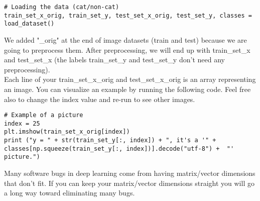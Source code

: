 \begin{verbatim}
# Loading the data (cat/non-cat)
train_set_x_orig, train_set_y, test_set_x_orig, test_set_y, classes = load_dataset()
\end{verbatim}

We added "\_orig" at the end of image datasets (train and test) because we are going to preprocess them. After preprocessing, we will end up with train\_set\_x and test\_set\_x (the labels train\_set\_y and test\_set\_y don't need any preprocessing).\\
Each line of your train\_set\_x\_orig and test\_set\_x\_orig is an array representing an image. You can visualize an example by running the following code. Feel free also to change the index value and re-run to see other images.

\begin{verbatim}
# Example of a picture
index = 25
plt.imshow(train_set_x_orig[index])
print ("y = " + str(train_set_y[:, index]) + ", it's a '" + classes[np.squeeze(train_set_y[:, index])].decode("utf-8") +  "' picture.")
\end{verbatim}

Many software bugs in deep learning come from having matrix/vector dimensions that don't fit. If you can keep your matrix/vector dimensions straight you will go a long way toward eliminating many bugs.

